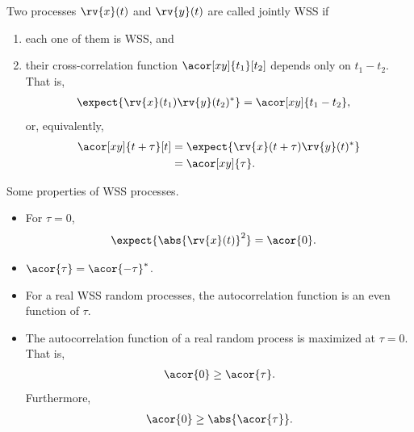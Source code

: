 \begin{definitionBox}
    Two processes $\rv{x}(t)$ and $\rv{y}(t)$ are called jointly WSS if
    \begin{enumerate}
        \item each one of them is WSS, and
        \item their cross-correlation function $\acor[xy]{t_{1}}[t_{2}]$ depends only on $t_{1}-t_{2}$. That is,
        \begin{align}
            \expect{\rv{x}(t_{1})\rv{y}(t_{2})^{\herm}} &= \acor[xy]{t_{1}-t_{2}},
        \end{align}
        or, equivalently,
        \begin{align}
            \acor[xy]{t+\tau}[t] &= \expect{\rv{x}(t+\tau)\rv{y}(t)^{\herm}}\\
            &= \acor[xy]{\tau}.
        \end{align}
    \end{enumerate}
\end{definitionBox}
\begin{remarkBox}
    Some properties of WSS processes. 
    
    \begin{itemize}
        \item For $\tau=0$,
        \begin{align}
            \expect{\abs{\rv{x}(t)}^{2}} &= \acor{0}.
        \end{align}
        \item $\acor{\tau} = \acor{-\tau}^{\herm}$.
        \item For a real WSS random processes, the autocorrelation function is an even function of $\tau$. 
        \item The autocorrelation function of a real random process is maximized at $\tau=0$. That is,
        \begin{align}
            \acor{0} \geq \acor{\tau}.
        \end{align}
        Furthermore,
        \begin{align}
            \acor{0}\geq \abs{\acor{\tau}}.
        \end{align}
    \end{itemize}
\end{remarkBox}
